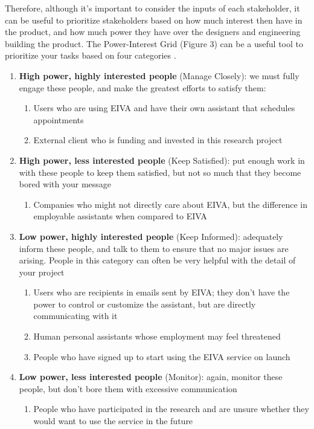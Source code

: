 \documentclass{article}
\begin{document}
Therefore, although it's important to consider the inputs of each stakeholder, it can be useful to prioritize stakeholders based on how much interest then have in the product, and how much power they have over the designers and engineering building the product. The Power-Interest Grid (Figure 3) can be a useful tool to prioritize your tasks based on four categories \cite{noauthor_stakeholder_nodate}.

\begin{enumerate}
 \item \textbf{High power, highly interested people} (Manage Closely): we must fully engage these people, and make the greatest efforts to satisfy them:
  \begin{enumerate}
    \item Users who are using EIVA and have their own assistant that schedules appointments
    \item External client who is funding and invested in this research project
  \end{enumerate}
 \item \textbf{High power, less interested people} (Keep Satisfied): put enough work in with these people to keep them satisfied, but not so much that they become bored with your message
  \begin{enumerate}
    \item Companies who might not directly care about EIVA, but the difference in employable assistants when compared to EIVA
  \end{enumerate}
 \item \textbf{Low power, highly interested people} (Keep Informed): adequately inform these people, and talk to them to ensure that no major issues are arising. People in this category can often be very helpful with the detail of your project
  \begin{enumerate}
    \item Users who are recipients in emails sent by EIVA; they don't have the power to control or customize the assistant, but are directly communicating with it
    \item Human personal assistants whose employment may feel threatened
    \item People who have signed up to start using the EIVA service on launch
  \end{enumerate}
 \item \textbf{Low power, less interested people} (Monitor): again, monitor these people, but don’t bore them with excessive communication
  \begin{enumerate}
    \item People who have participated in the research and are unsure whether they would want to use the service in the future
  \end{enumerate}
\end{enumerate}
\end{document}
